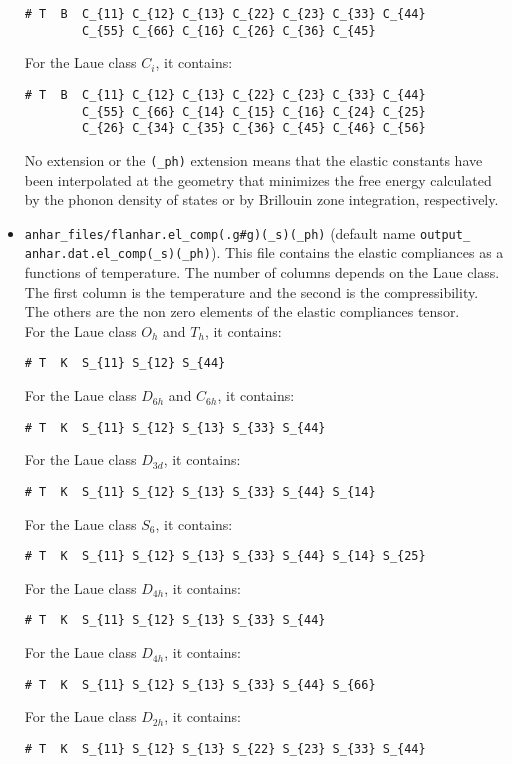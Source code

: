 \documentclass[12pt,a4paper,twoside]{report}
\begin{document}
\begin{itemize}
\begin{verbatim}
# T  B  C_{11} C_{12} C_{13} C_{22} C_{23} C_{33} C_{44} 
        C_{55} C_{66} C_{16} C_{26} C_{36} C_{45} 
\end{verbatim}
For the Laue class $C_i$, it contains:
\begin{verbatim}
# T  B  C_{11} C_{12} C_{13} C_{22} C_{23} C_{33} C_{44} 
        C_{55} C_{66} C_{14} C_{15} C_{16} C_{24} C_{25} 
        C_{26} C_{34} C_{35} C_{36} C_{45} C_{46} C_{56} 
\end{verbatim}
No extension or the \texttt{(\_ph)} extension means that the elastic
constants have been interpolated at the geometry that minimizes the
free energy calculated by the phonon density of states or by Brillouin
zone integration, respectively. 

\item
\texttt{anhar\_files/flanhar.el\_comp(.g\#g)(\_s)(\_ph)}
(default name \texttt{output\_} \texttt{anhar.dat.el\_comp(\_s)(\_ph)}). 
This file
contains the elastic compliances as a functions of temperature. 
The number of columns depends on the Laue class. The first column is the 
temperature and the second is the compressibility. The others are the
non zero elements of the elastic compliances tensor. \\ 
For the Laue class $O_h$ and $T_h$, it contains:
\begin{verbatim}
# T  K  S_{11} S_{12} S_{44}   
\end{verbatim}
For the Laue class $D_{6h}$ and $C_{6h}$, it contains:
\begin{verbatim}
# T  K  S_{11} S_{12} S_{13} S_{33} S_{44}  
\end{verbatim}
For the Laue class $D_{3d}$, it contains:
\begin{verbatim}
# T  K  S_{11} S_{12} S_{13} S_{33} S_{44} S_{14}  
\end{verbatim}
For the Laue class $S_{6}$, it contains:
\begin{verbatim}
# T  K  S_{11} S_{12} S_{13} S_{33} S_{44} S_{14} S_{25}  
\end{verbatim}
For the Laue class $D_{4h}$, it contains:
\begin{verbatim}
# T  K  S_{11} S_{12} S_{13} S_{33} S_{44}
\end{verbatim}
For the Laue class $D_{4h}$, it contains:
\begin{verbatim}
# T  K  S_{11} S_{12} S_{13} S_{33} S_{44} S_{66} 
\end{verbatim}
For the Laue class $D_{2h}$, it contains:
\begin{verbatim}
# T  K  S_{11} S_{12} S_{13} S_{22} S_{23} S_{33} S_{44} 

\end{verbatim}
\end{itemize}
\end{document}
